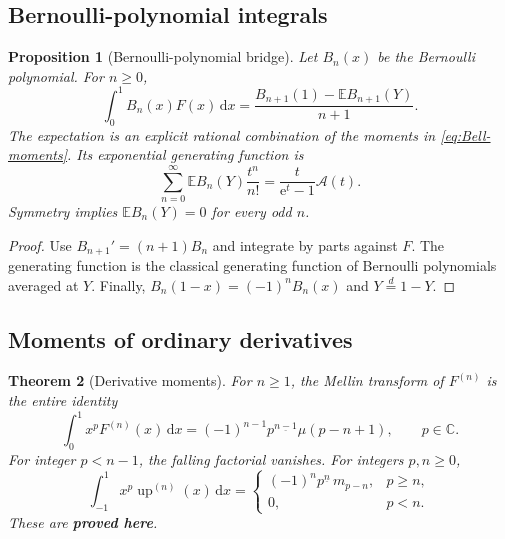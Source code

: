 \documentclass[11pt]{article}
\newcommand{\statusproved}{\textcolor{statusgreen}{\textbf{proved here}}}
\newtheorem{theorem}{Theorem}[section]
\newtheorem{proposition}[theorem]{Proposition}
\theoremstyle{definition}
\theoremstyle{remark}
\newcommand{\C}{\mathbb C}
\newcommand{\E}{\mathbb E}
\newcommand{\dd}{\,\mathrm d}
\newcommand{\e}{\mathrm e}
\newcommand{\Up}{\operatorname{up}}
\newcommand{\fall}[2]{#1^{\underline{#2}}}
\begin{document}
\subsection{Bernoulli-polynomial integrals}

\begin{proposition}[Bernoulli-polynomial bridge]
\label{prop:Bernoulli-polynomial}
Let $B_n(x)$ be the Bernoulli polynomial.  For $n\ge0$,
\begin{equation}
 \int_0^1B_n(x)F(x)\dd x
 =\frac{B_{n+1}(1)-\E B_{n+1}(Y)}{n+1}.
 \label{eq:Bernoulli-F-integral}
\end{equation}
The expectation is an explicit rational combination of the moments in
\cref{eq:Bell-moments}.  Its exponential generating function is
\begin{equation}
 \sum_{n=0}^{\infty}\E B_n(Y)\frac{t^n}{n!}
 =\frac{t}{\e^t-1}\mathscr A(t).
 \label{eq:Bernoulli-expectation-egf}
\end{equation}
Symmetry implies $\E B_n(Y)=0$ for every odd $n$.
\end{proposition}

\begin{proof}
Use $B_{n+1}'=(n+1)B_n$ and integrate by parts against $F$.  The generating function is the
classical generating function of Bernoulli polynomials averaged at $Y$.  Finally,
$B_n(1-x)=(-1)^nB_n(x)$ and $Y\overset d=1-Y$.
\end{proof}

\subsection{Moments of ordinary derivatives}

\begin{theorem}[Derivative moments]
\label{thm:derivative-moments}
For $n\ge1$, the Mellin transform of $F^{(n)}$ is the entire identity
\begin{equation}
 \int_0^1x^pF^{(n)}(x)\dd x
 =(-1)^{n-1}\fall{p}{n-1}\mu(p-n+1),
 \qquad p\in\C.
 \label{eq:F-derivative-moments}
\end{equation}
For integer $p<n-1$, the falling factorial vanishes.  For integers $p,n\ge0$,
\begin{equation}
 \int_{-1}^{1}x^p\Up^{(n)}(x)\dd x
 =\begin{cases}
 (-1)^n\fall p n\,m_{p-n},&p\ge n,\\
 0,&p<n.
 \end{cases}
 \label{eq:up-derivative-moments}
\end{equation}
These are \statusproved.
\end{theorem}
\end{document}
